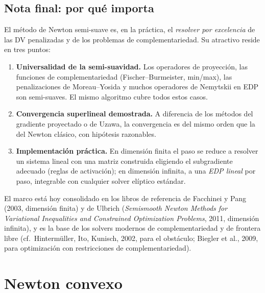 \documentclass[12pt]{book}
\theoremstyle{definition}
\theoremstyle{plain}
\theoremstyle{remark}
\begin{document}
\section{Nota final: por qué importa}\label{sec:final}

El método de Newton semi-suave es, en la práctica, el
\emph{resolver por excelencia} de las DV penalizadas y de los
problemas de complementariedad.  Su atractivo reside en tres
puntos:

\begin{enumerate}[leftmargin=1.4em,itemsep=2pt]
  \item \textbf{Universalidad de la semi-suavidad.}  Los
        operadores de proyección, las funciones de complementariedad
        (Fischer--Burmeister, min/max), las penalizaciones de
        Moreau--Yosida y muchos operadores de Nemytskii en EDP son
        semi-suaves.  El mismo algoritmo cubre todos estos casos.
  \item \textbf{Convergencia superlineal demostrada.}  A
        diferencia de los métodos del gradiente proyectado o de
        Uzawa, la convergencia es del mismo orden que la del
        Newton clásico, con hipótesis razonables.
  \item \textbf{Implementación práctica.}  En dimensión finita el
        paso se reduce a resolver un sistema lineal con una
        matriz construida eligiendo el subgradiente adecuado
        (reglas de activación); en dimensión infinita, a una
        \emph{EDP lineal} por paso, integrable con cualquier
        solver elíptico estándar.
\end{enumerate}

El marco está hoy consolidado en los libros de referencia de
Facchinei y Pang (2003, dimensión finita) y de Ulbrich
(\textit{Semismooth Newton Methods for Variational Inequalities
and Constrained Optimization Problems}, 2011, dimensión infinita),
y es la base de los solvers modernos de complementariedad y de
frontera libre (cf.\ Hintermüller, Ito, Kunisch, 2002, para el
obstáculo; Biegler et al., 2009, para optimización con
restricciones de complementariedad).

\chapter{Newton convexo}

\end{document}
